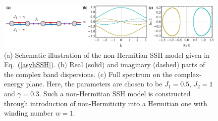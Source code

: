 \documentclass{tADP2e}
\theoremstyle{plain}
\theoremstyle{plain}
\theoremstyle{definition}
\begin{document}
\begin{figure}[!t]
\begin{center}
\includegraphics[width=14.5cm]{./Figures/fig_5_NHSSH.pdf}
\end{center}
\caption{(a) Schematic illustration of the non-Hermitian SSH model given in Eq.~(\ref{asyhSSH}). %
(b) Real (solid) and imaginary (dashed) parts of the complex band dispersions. %
(c) Full spectrum on the complex-energy plane. Here, the parameters are chosen to be $J_1=0.5$, $J_2=1$ and $\gamma=0.3$. Such a non-Hermitian SSH model is constructed through introduction of non-Hermiticity into a Hermitian one with winding number $w=1$.}
\label{fig:NHSSH}
\end{figure}
\end{document}
